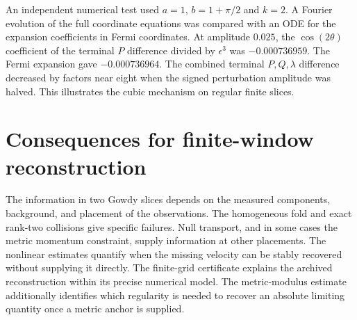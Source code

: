 \documentclass[11pt]{article}
\begin{document}
An independent numerical test used $a=1$, $b=1+\pi/2$ and $k=2$.
A Fourier evolution of the full coordinate equations was compared
with an ODE for the expansion coefficients in Fermi coordinates.
At amplitude $0.025$, the $\cos(2\theta)$ coefficient of the terminal
$P$ difference divided by $\epsilon^3$ was $-0.000736959$.
The Fermi expansion gave $-0.000736964$. The combined terminal
$P,Q,\lambda$ difference decreased by factors near eight when
the signed perturbation amplitude was halved.
This illustrates the cubic mechanism on regular finite slices.














\section{Consequences for finite-window reconstruction}
The information in two Gowdy slices depends on the measured
components, background, and placement of the observations.
The homogeneous fold and exact rank-two collisions give
specific failures. Null transport, and in some cases the
metric momentum constraint, supply information at other
placements. The nonlinear estimates quantify when the
missing velocity can be stably recovered without supplying
it directly. The finite-grid certificate explains the
archived reconstruction within its precise numerical model.
The metric-modulus estimate additionally identifies which
regularity is needed to recover an absolute limiting
quantity once a metric anchor is supplied.

\appendix

\end{document}
